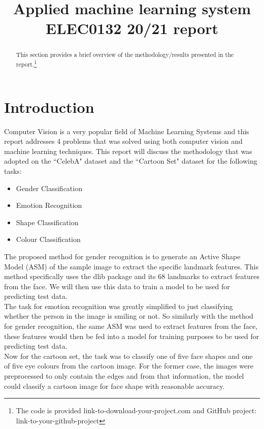 \documentclass{article}
\title{Applied machine learning system ELEC0132 20/21 report}
\begin{document}
%
\maketitle
%
\begin{abstract}
    This section provides a brief overview of the methodology/results presented in the report.\footnote{The code is provided link-to-download-your-project.com and GitHub project: link-to-your-github-project}
\end{abstract}
%

%

\section{Introduction}
\label{sec:intro}
    Computer Vision is a very popular field of Machine Learning Systems and this report addresses 4 problems that was solved using both computer vision and machine learning techniques. This report will discuss the methodology that was adopted on the ``CelebA" dataset and the ``Cartoon Set" dataset for the following tasks:
    \begin{itemize}
    	\item Gender Classification
    	\item Emotion Recognition
    	\item Shape Classification
    	\item Colour Classification
    \end{itemize}

    The proposed method for gender recognition is to generate an Active Shape Model (ASM) of the sample image to extract the specific landmark features. This method specifically uses the dlib package and its 68 landmarks to extract features from the face. We will then use this data to train a model to be used for predicting test data.\\
    
    The task for emotion recognition was greatly simplified to just classifying whether the person in the image is smiling or not. So similarly with the method for gender recognition, the same ASM was used to extract features from the face, these features would then be fed into a model for training purposes to be used for predicting test data.\\
    
    Now for the cartoon set, the task was to classify one of five face shapes and one of five eye colours from the cartoon image. For the former case, the images were preprocessed to only contain the edges and from that information, the model could classify a cartoon image for face shape with reasonable accuracy.\\
    
\end{document}
